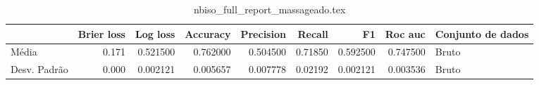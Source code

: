 \begin{table}
\centering
\caption{nbiso_full_report_massageado.tex}
\label{nbiso_full_report_massageado.tex}
\begin{tabular}{lrrrrrrrl}
\toprule
{} &  Brier  loss &  Log loss &  Accuracy  &  Precision  &  Recall  &       F1  &  Roc auc  & Conjunto de dados \\
\midrule
Média        &        0.171 &  0.521500 &   0.762000 &    0.504500 &  0.71850 &  0.592500 &  0.747500 &             Bruto \\
Desv. Padrão &        0.000 &  0.002121 &   0.005657 &    0.007778 &  0.02192 &  0.002121 &  0.003536 &             Bruto \\
\bottomrule
\end{tabular}
\end{table}
